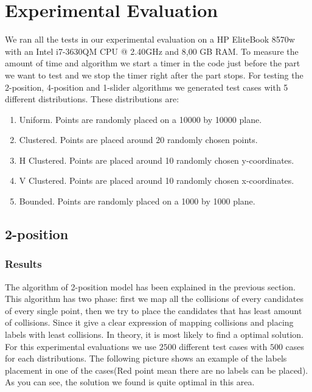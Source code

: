 \documentclass[crop=false,a4paper,oneside,11pt]{standalone}
\begin{document}
\section{Experimental Evaluation}

We ran all the tests in our experimental evaluation on a HP EliteBook 8570w with an Intel i7-3630QM CPU @ 2.40GHz and 8,00 GB RAM. To measure the amount of time and algorithm we start a timer in the code just before the part we want to test and we stop the timer right after the part stops. For testing the 2-position, 4-position and 1-slider algorithms we generated test cases with 5 different distributions. These distributions are:
\begin{enumerate}
    \item Uniform. Points are randomly placed on a 10000 by 10000 plane.
    \item Clustered. Points are placed around 20 randomly chosen points.
    \item H Clustered. Points are placed around 10 randomly chosen y-coordinates.
    \item V Clustered. Points are placed around 10 randomly chosen x-coordinates.
    \item Bounded. Points are randomly placed on a 1000 by 1000 plane.
\end{enumerate}

\subsection{2-position}
\subsubsection{Results}
The algorithm of 2-position model has been explained in the previous section. This algorithm has two phase: first we map all the collisions of every candidates of every single point, then we try to place the candidates that has least amount of collisions. Since it give a clear expression of mapping collisions and placing labels with least collisions. In theory, it is most likely to find a optimal solution. For this experimental evaluations we use $2500$ different test cases with $500$ cases for each distributions. The following picture shows an example of the labels placement in one of the cases(Red point mean there are no labels can be placed). As you can see, the solution we found is quite optimal in this area.
\end{document}
